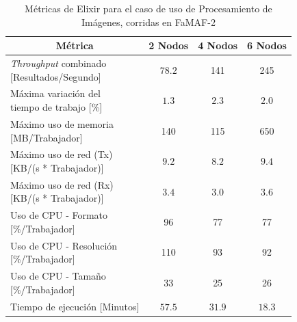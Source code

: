 \documentclass[11pt]{article}
\providecommand{\row}[1]{\parbox{150pt}{\setlength{\baselineskip}{0.2\baselineskip}\strut#1\strut}}
\newcommand{\ipcap}[2]{\caption{Métricas de #1 para el caso de uso de Procesamiento de Imágenes, corridas en #2}}
\newcommand{\english}[1]{\textit{#1}}
\begin{document}
\begin{table}[H]
\centering
\begin{tabular}{|l|c|c|c|}
\hline
\multicolumn{1}{|c|}{Métrica} & 2 Nodos & 4 Nodos & 6 Nodos \\ \hline
\row{\english{Throughput} combinado\\{[Resultados/Segundo]}} & $78.2$ & 141 & 245 \\ \hline
\row{Máxima variación del\\tiempo de trabajo [\%]} & $1.3$ & $2.3$ & $2.0$ \\ \hline
\row{Máximo uso de memoria\\{[MB/Trabajador]}} & 140 & 115 & 650 \\ \hline
\row{Máximo uso de red (Tx)\\{[KB/(s * Trabajador)]}} & $9.2$ & $8.2$ & $9.4$ \\ \hline
\row{Máximo uso de red (Rx)\\{[KB/(s * Trabajador)]}} & $3.4$ & $3.0$ & $3.6$ \\ \hline
\row{Uso de CPU - Formato\\ {[\%/Trabajador]}} & 96 & 77 & 77 \\ \hline
\row{Uso de CPU - Resolución\\ {[\%/Trabajador]}} & 110 & 93 & 92 \\ \hline
\row{Uso de CPU - Tamaño\\ {[\%/Trabajador]}} & 33 & 25 & 26 \\ \hline
Tiempo de ejecución {[Minutos]} & $57.5$ & $31.9$ & $18.3$ \\ \hline
\end{tabular}
\ipcap{Elixir}{FaMAF-2}
\end{table}
\end{document}
